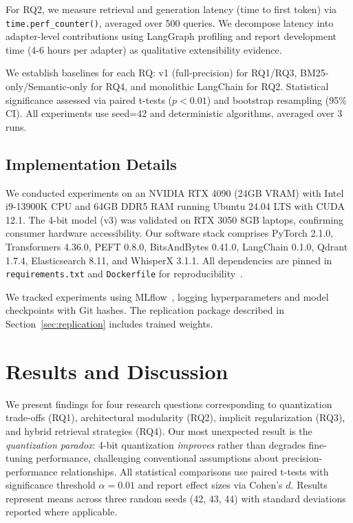 \documentclass[pdflatex,sn-basic]{sn-jnl}
\begin{document}
For RQ2, we measure retrieval and generation latency (time to first token) via \texttt{time.perf\_counter()}, averaged over 500 queries. We decompose latency into adapter-level contributions using LangGraph profiling and report development time (4-6 hours per adapter) as qualitative extensibility evidence.

We establish baselines for each RQ: v1 (full-precision) for RQ1/RQ3, BM25-only/Semantic-only for RQ4, and monolithic LangChain for RQ2. Statistical significance assessed via paired t-tests ($p < 0.01$) and bootstrap resampling (95\% CI). All experiments use seed=42 and deterministic algorithms, averaged over 3 runs.

\subsection{Implementation Details}
\label{sec:method-implementation}

We conducted experiments on an NVIDIA RTX 4090 (24GB VRAM) with Intel i9-13900K CPU and 64GB DDR5 RAM running Ubuntu 24.04 LTS with CUDA 12.1. The 4-bit model (v3) was validated on RTX 3050 8GB laptops, confirming consumer hardware accessibility. Our software stack comprises PyTorch 2.1.0, Transformers 4.36.0, PEFT 0.8.0, BitsAndBytes 0.41.0, LangChain 0.1.0, Qdrant 1.7.4, Elasticsearch 8.11, and WhisperX 3.1.1. All dependencies are pinned in \texttt{requirements.txt} and \texttt{Dockerfile} for reproducibility~\citep{paleyes2022mle}.

We tracked experiments using MLflow~\citep{chen2020mlflow}, logging hyperparameters and model checkpoints with Git hashes. The replication package described in Section~\ref{sec:replication} includes trained weights.

\section{Results and Discussion}
\label{sec:results}

We present findings for four research questions corresponding to quantization trade-offs (RQ1), architectural modularity (RQ2), implicit regularization (RQ3), and hybrid retrieval strategies (RQ4). Our most unexpected result is the \textit{quantization paradox}: 4-bit quantization \textit{improves} rather than degrades fine-tuning performance, challenging conventional assumptions about precision-performance relationships. All statistical comparisons use paired t-tests with significance threshold $\alpha=0.01$ and report effect sizes via Cohen's $d$. Results represent means across three random seeds (42, 43, 44) with standard deviations reported where applicable.
\end{document}
